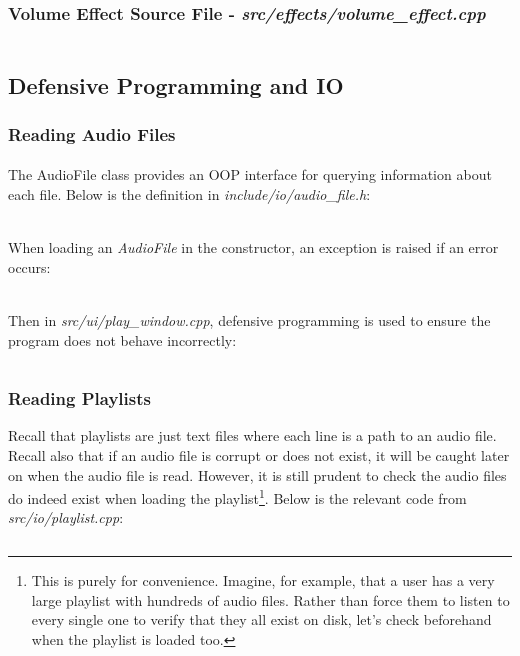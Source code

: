 \subsubsection{Volume Effect Source File - \textit{src/effects/volume\_effect.cpp}}
\inputminted[linenos]{c++}{../src/effects/volume_effect.cpp}


\pagebreak
\subsection{Defensive Programming and IO}

\subsubsection{Reading Audio Files}
\paragraph{}
The AudioFile class provides an OOP interface for querying information about each file. Below is the definition in \textit{include/io/audio\_file.h}:
\inputminted[linenos]{c++}{../include/io/audio_file.h}

\paragraph{}
When loading an \textit{AudioFile} in the constructor, an exception is raised if an error occurs:
\inputminted[linenos, firstline=4, lastline=10]{c++}{../src/io/audio_file.cpp}

\paragraph{}
Then in \textit{src/ui/play\_window.cpp},  defensive programming is used to ensure the program does not behave incorrectly:
\pagebreak
\inputminted[linenos, firstline=303, lastline=348]{c++}{../src/ui/play_window.cpp}

\pagebreak
\subsubsection{Reading Playlists}
Recall that playlists are just text files where each line is a path to an audio file. Recall also that if an audio file is corrupt or does not exist, it will be caught later on when the audio file is read. However, it is still prudent to check the audio files do indeed exist when loading the playlist\footnote{
	This is purely for convenience. Imagine, for example, that a user has a very large playlist with hundreds of audio files. Rather than force them to listen to every single one to verify that they all exist on disk, let's check beforehand when the playlist is loaded too.
}. Below is the relevant code from \textit{src/io/playlist.cpp}:
\inputminted[linenos, firstline=25, lastline=55]{c++}{../src/io/playlist.cpp}

